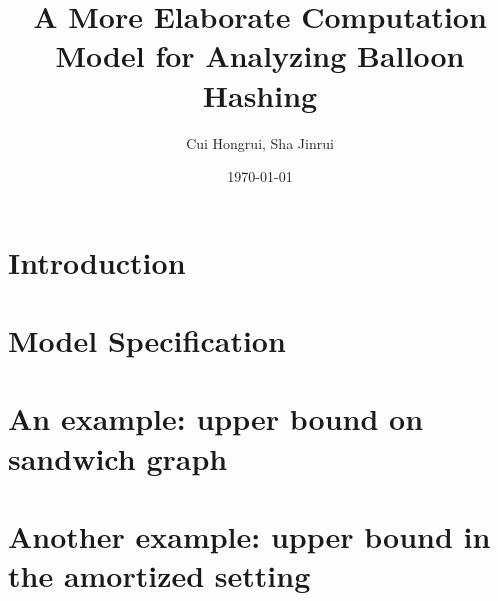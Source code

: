 \documentclass[a4paper, oneside]{article}
\author{Cui Hongrui, Sha Jinrui}
\title{A More Elaborate Computation Model for Analyzing Balloon Hashing}
\date{\today}
\begin{document}
\maketitle{}

\section{Introduction}\label{sec::intro}


\section{Model Specification}\label{sec::model}


\section{An example: upper bound on sandwich graph}\label{sec::sandwich}


\section{Another example: upper bound in the amortized setting}\label{sec::cc}




\end{document}
